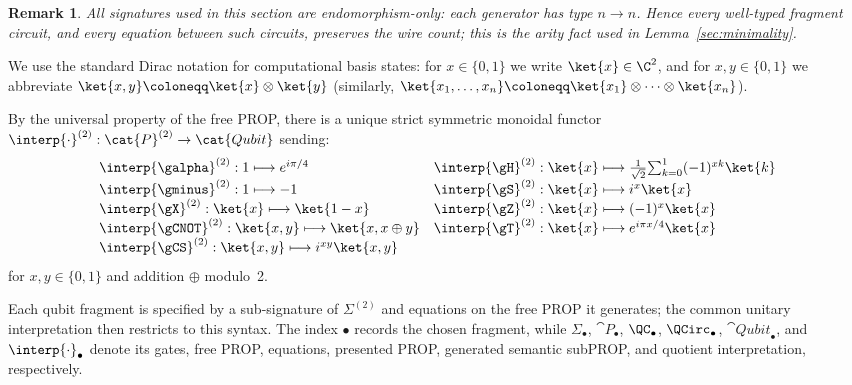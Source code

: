 \documentclass[10pt,a4paper]{article}
\newtheorem{remark}[theorem]{Remark}
\def\cref#1{Lemma~\ref{#1}}%
\begin{document}
\begin{remark}\label{rem:arity-preservation}
All signatures used in this section are endomorphism-only: each generator has type \(n\to n\).
Hence every well-typed fragment circuit, and every equation between such circuits, preserves the
wire count; this is the arity fact used in \cref{sec:minimality}.
\end{remark}

We use the standard Dirac notation for computational basis states: for \(x\in\{0,1\}\) we write \(\ket{x}\in\C^2\),
and for \(x,y\in\{0,1\}\) we abbreviate \(\ket{x,y}\coloneqq \ket{x}\otimes\ket{y}\) (similarly,
\(\ket{x_1,\ldots,x_n}\coloneqq \ket{x_1}\otimes\cdots\otimes\ket{x_n}\)).

By the universal property of the free PROP, there is a unique strict
symmetric monoidal functor
\(
  \interp{\cdot}^{(2)}:\cat{P}^{(2)}\to\cat{Qubit}
\)
sending:
\begin{equation*}
\begin{array}{l l}
 \interp{\galpha}^{(2)} : 1\longmapsto e^{i\pi/4} &
 \interp{\gH}^{(2)} : \ket{x}\longmapsto
     \tfrac1{\sqrt2}\!\sum_{k=0}^1(-1)^{xk}\ket{k}\\
 \interp{\gminus}^{(2)} : 1\longmapsto -1 &
 \interp{\gS}^{(2)} : \ket{x}\longmapsto i^x\ket{x} \\
 \interp{\gX}^{(2)} : \ket{x}\longmapsto\ket{1-x} &
 \interp{\gZ}^{(2)} : \ket{x}\longmapsto(-1)^x\ket{x} \\
 \interp{\gCNOT}^{(2)} : \ket{x,y}\longmapsto\ket{x,x\oplus y} &
 \interp{\gT}^{(2)} : \ket{x}\longmapsto e^{i\pi x/4}\ket{x} \\
 \interp{\gCS}^{(2)} : \ket{x,y}\longmapsto i^{xy}\ket{x,y}
\end{array}
\end{equation*}
for \(x,y\in\{0,1\}\) and addition \(\oplus\) modulo~2.

Each qubit fragment is specified by a sub-signature of \(\Sigma^{(2)}\) and equations on the free
PROP it generates; the common unitary interpretation then restricts to this syntax.  The index
\(\bullet\) records the chosen fragment, while \(\Sigma_\bullet\), \(\cat{P}_\bullet\),
\(\QC_\bullet\), \(\QCirc_\bullet\), \(\cat{Qubit}_\bullet\), and
\(\interp{\cdot}_\bullet\) denote its gates, free PROP, equations, presented PROP, generated
semantic subPROP, and quotient interpretation, respectively.
\end{document}
